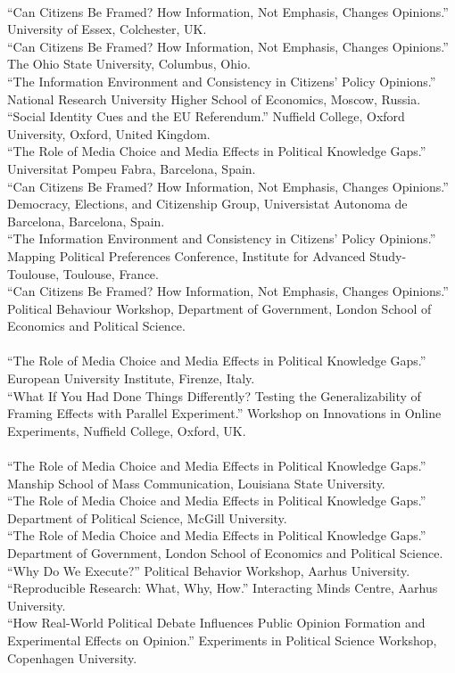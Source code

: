 \documentclass[12pt]{article}
\newcommand{\topic}[1]{\pagebreak[3]\indent {\color{lg}{\footnotesize #1 }}\\}
\newcommand{\entry}[1]{\indent {\color{lg}\guillemotright}\hspace{2pt}#1\vspace{.25em}\\}
\begin{document}
{	\topic{Invited Presentations (2016)}
	\entry{``Can Citizens Be Framed? How Information, Not Emphasis, Changes Opinions.'' University of Essex, Colchester, UK.}
	\entry{``Can Citizens Be Framed? How Information, Not Emphasis, Changes Opinions.'' The Ohio State University, Columbus, Ohio.}
	\entry{``The Information Environment and Consistency in Citizens' Policy Opinions.'' National Research University Higher School of Economics, Moscow, Russia.}
	\entry{``Social Identity Cues and the EU Referendum.'' Nuffield College, Oxford University, Oxford, United Kingdom.}
	\entry{``The Role of Media Choice and Media Effects in Political Knowledge Gaps.'' Universitat Pompeu Fabra, Barcelona, Spain.}
	\entry{``Can Citizens Be Framed? How Information, Not Emphasis, Changes Opinions.'' Democracy, Elections, and Citizenship Group, Universistat Autonoma de Barcelona, Barcelona, Spain.}
	\entry{``The Information Environment and Consistency in Citizens' Policy Opinions.'' Mapping Political Preferences Conference, Institute for Advanced Study-Toulouse, Toulouse, France.}
	\entry{``Can Citizens Be Framed? How Information, Not Emphasis, Changes Opinions.'' Political Behaviour Workshop, Department of Government, London School of Economics and Political Science.}

	\topic{Invited Presentations (2015)}
	\entry{``The Role of Media Choice and Media Effects in Political Knowledge Gaps.'' European University Institute, Firenze, Italy.}
	\entry{``What If You Had Done Things Differently? Testing the Generalizability of Framing Effects with Parallel Experiment.'' Workshop on Innovations in Online Experiments, Nuffield College, Oxford, UK.}
	
	\topic{Invited Presentations (2014)}
	\entry{``The Role of Media Choice and Media Effects in Political Knowledge Gaps.'' Manship School of Mass Communication, Louisiana State University.}
	\entry{``The Role of Media Choice and Media Effects in Political Knowledge Gaps.'' Department of Political Science, McGill University.}
	\entry{``The Role of Media Choice and Media Effects in Political Knowledge Gaps.'' Department of Government, London School of Economics and Political Science.}
	\entry{``Why Do We Execute?'' Political Behavior Workshop, Aarhus University.}
	\entry{``Reproducible Research: What, Why, How.'' Interacting Minds Centre, Aarhus University.}
	\entry{``How Real-World Political Debate Influences Public Opinion Formation and Experimental Effects on Opinion.'' Experiments in Political Science Workshop, Copenhagen University.}

}
\end{document}
